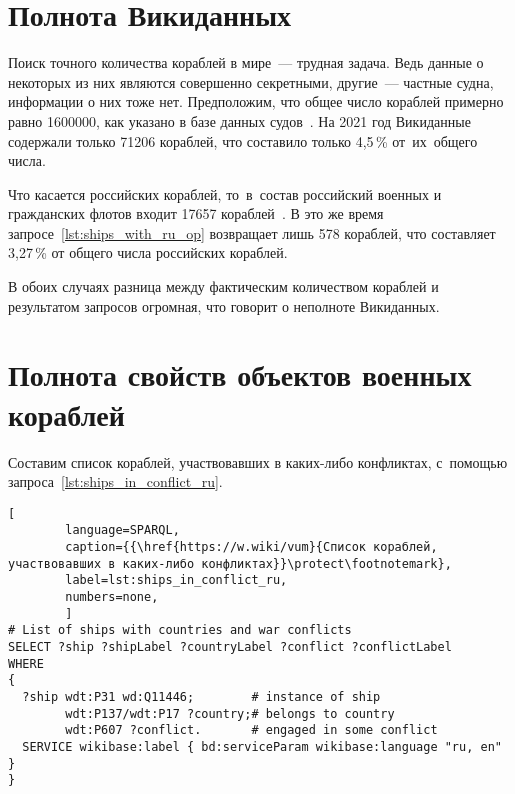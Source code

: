 \newpage
\section{Полнота Викиданных}

Поиск точного количества кораблей в мире~--- трудная задача. 
Ведь данные о некоторых из них являются совершенно секретными, 
другие~--- частные судна, информации о них тоже нет. 
Предположим, что общее число кораблей примерно равно \num{1600000}, 
как указано в базе данных судов~\autocite{FleetMon}. 
На 2021 год Викиданные содержали только \num{71206} кораблей, 
что составило только 4,5\,\% от~их~общего числа.


Что касается российских кораблей, 
то~в~состав российский военных и гражданских флотов входит \num{17657} кораблей~\autocite{RussianShips}. 
В это же время запросе~\ref{lst:ships_with_ru_op} возвращает лишь 578 кораблей, 
что составляет 3,27\,\% от общего числа российских кораблей. 

В обоих случаях разница между фактическим количеством кораблей и результатом запросов огромная, что говорит о неполноте Викиданных.






\section{Полнота свойств объектов военных кораблей}

Составим список кораблей, участвовавших в каких-либо конфликтах, 
с~помощью запроса~\ref{lst:ships_in_conflict_ru}.

\begin{lstlisting}[ 
        language=SPARQL, 
        caption={{\href{https://w.wiki/vum}{Список кораблей, участвовавших в каких-либо конфликтах}}\protect\footnotemark}, 
        label=lst:ships_in_conflict_ru, 
        numbers=none,
        ]
# List of ships with countries and war conflicts
SELECT ?ship ?shipLabel ?countryLabel ?conflict ?conflictLabel
WHERE
{
  ?ship wdt:P31 wd:Q11446;        # instance of ship
        wdt:P137/wdt:P17 ?country;# belongs to country
        wdt:P607 ?conflict.       # engaged in some conflict
  SERVICE wikibase:label { bd:serviceParam wikibase:language "ru, en" }
}
\end{lstlisting}



